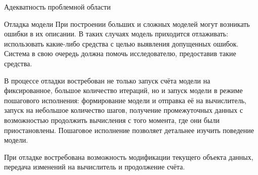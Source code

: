 \documentclass[a4paper,12pt]{extarticle}
\begin{document}
\begin{subsection}{Адекватность проблемной области}
    \begin{subsubsection}{Отладка модели}
        При построении больших и сложных моделей могут возникать ошибки в их описании. В таких случаях модель приходится отлаживать: использовать какие-либо средства с целью выявления допущенных ошибок. Система в свою очередь должна помочь исследователю, предоставив такие средства.
        
        В процессе отладки востребован не только запуск счёта модели на фиксированное, большое количество итераций, но и запуск модели в режиме пошагового исполнения: формирование модели и отправка её на вычислитель, запуск на небольшое количество шагов, получение промежуточных данных с возможностью продолжить вычисления с того момента, где они были приостановлены. Пошаговое исполнение позволяет детальнее изучить поведение модели.
        
        При отладке востребована возможность модификации текущего объекта данных, передача изменений на вычислитель и продолжение счёта.
    \end{subsubsection}

\end{subsection}
\end{document}
